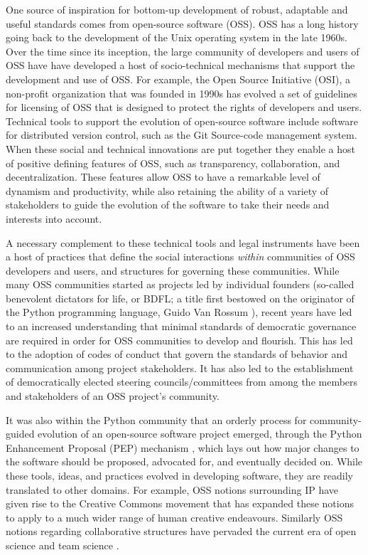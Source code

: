 \documentclass[
  letterpaper,
  DIV=11,
  numbers=noendperiod]{scrartcl}
\begin{document}
One source of inspiration for bottom-up development of robust, adaptable
and useful standards comes from open-source software (OSS). OSS has a
long history going back to the development of the Unix operating system
in the late 1960s. Over the time since its inception, the large
community of developers and users of OSS have have developed a host of
socio-technical mechanisms that support the development and use of OSS.
For example, the Open Source Initiative (OSI), a non-profit organization
that was founded in 1990s has evolved a set of guidelines for licensing
of OSS that is designed to protect the rights of developers and users.
Technical tools to support the evolution of open-source software include
software for distributed version control, such as the Git Source-code
management system. When these social and technical innovations are put
together they enable a host of positive defining features of OSS, such
as transparency, collaboration, and decentralization. These features
allow OSS to have a remarkable level of dynamism and productivity, while
also retaining the ability of a variety of stakeholders to guide the
evolution of the software to take their needs and interests into
account.

A necessary complement to these technical tools and legal instruments
have been a host of practices that define the social interactions
\emph{within} communities of OSS developers and users, and structures
for governing these communities. While many OSS communities started as
projects led by individual founders (so-called benevolent dictators for
life, or BDFL; a title first bestowed on the originator of the Python
programming language, Guido Van Rossum \cite{Van_Rossum2008BDFL}),
recent years have led to an increased understanding that minimal
standards of democratic governance are required in order for OSS
communities to develop and flourish. This has led to the adoption of
codes of conduct that govern the standards of behavior and communication
among project stakeholders. It has also led to the establishment of
democratically elected steering councils/committees from among the
members and stakeholders of an OSS project's community.

It was also within the Python community that an orderly process for
community-guided evolution of an open-source software project emerged,
through the Python Enhancement Proposal (PEP) mechanism
\cite{Warsaw2000PEP1}, which lays out how major changes to the software
should be proposed, advocated for, and eventually decided on. While
these tools, ideas, and practices evolved in developing software, they
are readily translated to other domains. For example, OSS notions
surrounding IP have given rise to the Creative Commons movement that has
expanded these notions to apply to a much wider range of human creative
endeavours. Similarly OSS notions regarding collaborative structures
have pervaded the current era of open science and team science
\cite{Baumgartner2023TeamScience, Koch2016TeamScience}.
\end{document}
